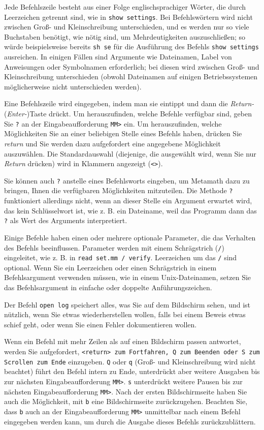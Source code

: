 Jede Befehlszeile besteht aus einer Folge englischsprachiger Wörter, die durch Leerzeichen getrennt sind, wie in \texttt{show settings}.  Bei Befehlswörtern wird nicht zwischen Groß- und Kleinschreibung unterschieden, und es werden nur so viele Buchstaben benötigt, wie nötig sind, um Mehrdeutigkeiten auszuschließen; so würde beispielsweise bereits \texttt{sh se} für die Ausführung des Befehls \texttt{show settings} ausreichen.  In einigen Fällen sind Argumente wie Dateinamen, Label von Anweisungen oder Symbolnamen erforderlich; bei diesen wird zwischen Groß- und Kleinschreibung unterschieden (obwohl Dateinamen auf einigen Betriebssystemen möglicherweise nicht unterschieden werden). 

Eine Befehlszeile wird eingegeben, indem man sie eintippt und dann die {\em Return-} ({\em Enter-})Taste drückt.  Um herauszufinden, welche Befehle verfügbar sind, geben Sie \texttt{?} an der Eingabeaufforderung \texttt{MM>} ein.  Um herauszufinden, welche Möglichkeiten Sie an einer beliebigen Stelle eines Befehls haben, drücken Sie {\em return} und Sie werden dazu aufgefordert eine angegebene Möglichkeit auszuwählen.  Die Standardauswahl (diejenige, die ausgewählt wird, wenn Sie nur {\em Return} drücken) wird in Klammern angezeigt (\texttt{<>}). 

Sie können auch \texttt{?} anstelle eines Befehlsworts eingeben, um Metamath dazu zu bringen, Ihnen die verfügbaren Möglichkeiten mitzuteilen.  Die Methode \texttt{?} funktioniert allerdings nicht, wenn an dieser Stelle ein Argument erwartet wird, das kein Schlüsselwort ist, wie z. B. ein Dateiname, weil das Programm dann das \texttt{?} als Wert des Arguments interpretiert. 

Einige Befehle haben einen oder mehrere optionale Parameter, die das Verhalten des Befehls beeinflussen.  Parameter werden mit einem Schrägstrich (\texttt{/}) eingeleitet, wie z. B. in \texttt{read set.mm / verify}.  Leerzeichen um das \texttt{/} sind optional.  Wenn Sie ein Leerzeichen oder einen Schrägstrich in einem Befehlsargument verwenden müssen, wie in einem Unix-Dateinamen, setzen Sie das Befehlsargument in einfache oder doppelte Anführungszeichen. 

Der Befehl \texttt{open log} speichert alles, was Sie auf dem Bildschirm sehen, und ist nützlich, wenn Sie etwas wiederherstellen wollen, falls bei einem Beweis etwas schief geht, oder wenn Sie einen Fehler dokumentieren wollen. 

Wenn ein Befehl mit mehr Zeilen als auf einen Bildschirm passen antwortet, werden Sie aufgefordert, \texttt{<return> zum Fortfahren, Q zum Beenden oder S zum Scrollen zum Ende} einzugeben.  \texttt{Q} oder \texttt{q} (Groß- und Kleinschreibung wird nicht beachtet) führt den Befehl intern zu Ende, unterdrückt aber weitere Ausgaben bis zur nächsten Eingabeaufforderung \texttt{MM>}.  \texttt{s} unterdrückt weitere Pausen bis zur nächsten Eingabeaufforderung \texttt{MM>}.  Nach der ersten Bildschirmseite haben Sie auch die Möglichkeit, mit \texttt{b} eine Bildschirmseite zurückzugehen.  Beachten Sie, dass \texttt{b} auch an der Eingabeaufforderung \texttt{MM>} unmittelbar nach einem Befehl eingegeben werden kann, um durch die Ausgabe dieses Befehls zurückzublättern. 

